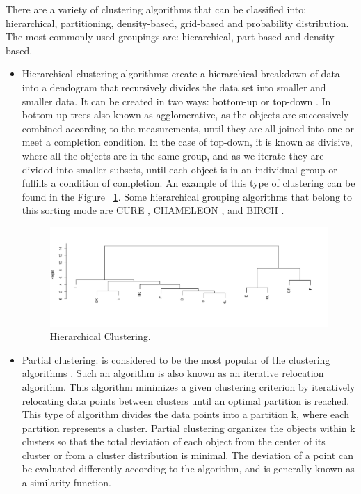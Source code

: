 There are a variety of clustering algorithms that can be classified into: hierarchical, partitioning, density-based, grid-based and probability distribution. The most commonly used groupings are: hierarchical, part-based and density-based.
\\
\begin{itemize}
  \item Hierarchical clustering algorithms: create a hierarchical breakdown of data into a dendogram that recursively divides the data set into smaller and smaller data. It can be created in two ways: bottom-up or top-down \citep{b19}. In bottom-up trees also known as agglomerative, as the objects are successively combined according to the measurements, until they are all joined into one or meet a completion condition.  In the case of top-down, it is known as divisive, where all the objects are in the same group, and as we iterate they are divided into smaller subsets, until each object is in an individual group or fulfills a condition of completion. An example of this type of clustering can be found in the Figure ~\ref{fig:hierarchical}. Some hierarchical grouping algorithms that belong to this sorting mode are CURE \citep{b20}, CHAMELEON \citep{b21}, and BIRCH \citep{b22}.
\begin{figure}[htbp]
  \centering
   \includegraphics[width=0.9\linewidth, height=0.2\textheight]{img/hierarchical.pdf}
    \caption{Hierarchical Clustering.}
    \label{fig:hierarchical}%
\end{figure}
  \item Partial clustering: is considered to be the most popular of the clustering algorithms \citep{b23}. Such an algorithm is also known as an iterative relocation algorithm. This algorithm minimizes a given clustering criterion by iteratively relocating data points between clusters until an optimal partition is reached. This type of algorithm divides the data points into a partition
k, where each partition represents a cluster.
Partial clustering organizes the objects within k clusters so that the total deviation of each object from the center of its cluster or from a cluster distribution is minimal. The deviation of a point can be evaluated differently according to the algorithm, and is generally known as a similarity function.

\end{itemize}

